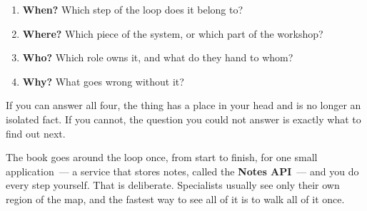 \begin{enumerate}
\def\labelenumi{\arabic{enumi}.}
\tightlist
\item
  \textbf{When?} Which step of the loop does it belong to?
\item
  \textbf{Where?} Which piece of the system, or which part of the workshop?
\item
  \textbf{Who?} Which role owns it, and what do they hand to whom?
\item
  \textbf{Why?} What goes wrong without it?
\end{enumerate}

\noindent{}If you can answer all four, the thing has a place in your head and is no longer an isolated fact. If you cannot, the question you could not answer is exactly what to find out next.

\label{how-software-gets-built:how-this-book-walks-the-map}

The book goes around the loop once, from start to finish, for one small application~--- a service that stores notes, called the \textbf{Notes API}~--- and you do every step yourself. That is deliberate. Specialists usually see only their own region of the map, and the fastest way to see all of it is to walk all of it once.

